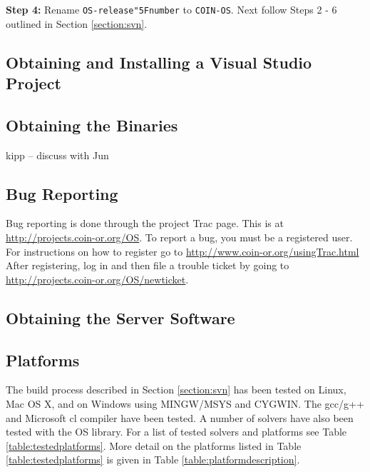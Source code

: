 \documentclass[11pt]{article}
\renewcommand{\_}{{\char"5F}}
\renewcommand{\{}{{\char"7B}}
\renewcommand{\}}{{\char"7D}}
\renewcommand{\^}{{\char"0D}}
\renewcommand{\'}{{\char"0D}}
\begin{document}
{\bf Step 4:} Rename {\tt OS-release\_number} to {\tt COIN-OS}.    Next follow Steps 2 - 6 outlined in Section \ref{section:svn}.





\subsection{Obtaining and Installing a Visual Studio Project}

\subsection{Obtaining the Binaries}

kipp -- discuss with Jun


\subsection{Bug Reporting}

Bug reporting is done through the project Trac page. This is at \url{http://projects.coin-or.org/OS}.  To report a bug, you must be a registered user.  For  instructions on  how to register go to 
 \url{http://www.coin-or.org/usingTrac.html}  After registering, log in and then file a trouble ticket by going to \url{http://projects.coin-or.org/OS/newticket}.

\subsection{Obtaining the Server Software}


\subsection{Platforms}

The build process described in Section \ref{section:svn} has been tested on Linux, Mac OS X, and on Windows using  MINGW/MSYS and CYGWIN. The  gcc/g++ and Microsoft  cl compiler have been tested. A number of solvers have also been tested with the OS library. For a list of tested solvers and platforms see Table \ref{table:testedplatforms}.  More detail on the platforms listed in Table  \ref{table:testedplatforms} is given in Table \ref{table:platformdescription}.
\end{document}
